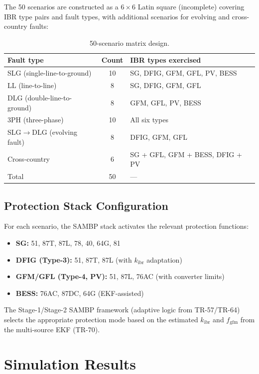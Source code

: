 \documentclass[11pt, a4paper]{article}
\begin{document}
The 50 scenarios are constructed as a $6\times 6$ Latin square (incomplete)
covering IBR type pairs and fault types, with additional scenarios for
evolving and cross-country faults:

\begin{table}[ht]
\centering
\caption{50-scenario matrix design.}
\label{tab:matrix}
\begin{tabular}{lcl}
\toprule
Fault type & Count & IBR types exercised \\
\midrule
SLG (single-line-to-ground)     & 10 & SG, DFIG, GFM, GFL, PV, BESS \\
LL (line-to-line)               & 8  & SG, DFIG, GFM, GFL \\
DLG (double-line-to-ground)     & 8  & GFM, GFL, PV, BESS \\
3PH (three-phase)               & 10 & All six types \\
SLG$\to$DLG (evolving fault)    & 8  & DFIG, GFM, GFL \\
Cross-country                   & 6  & SG + GFL, GFM + BESS, DFIG + PV \\
\midrule
Total                           & 50 & --- \\
\bottomrule
\end{tabular}
\end{table}

\subsection{Protection Stack Configuration}

For each scenario, the SAMBP stack activates the relevant protection functions:

\begin{itemize}
  \item \textbf{SG:} 51, 87T, 87L, 78, 40, 64G, 81
  \item \textbf{DFIG (Type-3):} 51, 87T, 87L (with $k_{\mathrm{ibr}}$ adaptation)
  \item \textbf{GFM/GFL (Type-4, PV):} 51, 87L, 76AC (with converter limits)
  \item \textbf{BESS:} 76AC, 87DC, 64G (EKF-assisted)
\end{itemize}

The Stage-1/Stage-2 SAMBP framework (adaptive logic from TR-57/TR-64) selects
the appropriate protection mode based on the estimated $k_{\mathrm{ibr}}$ and
$f_{\mathrm{gfm}}$ from the multi-source EKF (TR-70).

\section{Simulation Results}
\label{sec:results}
\end{document}
